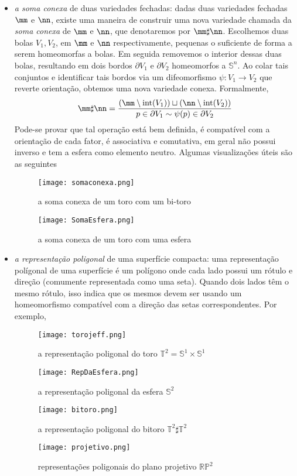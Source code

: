 \begin{itemize}
\item \emph{a soma conexa} de duas variedades fechadas: dadas duas variedades fechadas $\mm$ e $\nn$, existe uma maneira de construir uma nova variedade chamada da \emph{soma conexa} de $\mm$ e $\nn$, que denotaremos por $\mm \sharp \nn$. Escolhemos duas bolas $V_1, V_2$, em $\mm$ e $\nn$ respectivamente, pequenas o suficiente de forma a serem homeomorfas a bolas. Em seguida removemos o interior dessas duas bolas, resultando em dois bordos $\partial V_1$ e $\partial V_2$ homeomorfos a $\mathbb{S}^n$. Ao colar tais conjuntos e identificar tais bordos via um difeomorfismo $\psi: V_1 \to V_2$ que reverte orientação, obtemos uma nova variedade conexa. Formalmente, 
\[
\mm \sharp \nn = \frac{(\mm \setminus \text{int}(V_1)) \sqcup (\nn \setminus \text{int}(V_2))}{p \in \partial V_1 \sim \psi(p) \in \partial V_2}
\] Pode-se provar que tal operação está bem definida, é compatível com a orientação de cada fator, é associativa e comutativa, em geral não possui inverso e tem a esfera como elemento neutro. Algumas visualizações úteis são as seguintes
\begin{figure}[H]
\centering
\texttt{[image: somaconexa.png]}
\caption{a soma conexa de um toro com um bi-toro}
\end{figure}
\begin{figure}[H]
\centering
\texttt{[image: SomaEsfera.png]}
\caption{a soma conexa de um toro com uma esfera}
\end{figure}
\item \emph{a representação poligonal} de uma superfície compacta: uma representação polígonal de uma superfície é um polígono onde cada lado possui um rótulo e direção (comumente representada como uma seta). Quando dois lados têm o mesmo rótulo, isso indica que os mesmos devem ser  usando um homeomorfismo compatível com a direção das setas correspondentes. Por exemplo, 
\begin{figure}[H]
\centering
\texttt{[image: torojeff.png]}
\caption{a representação poligonal do toro $\mathbb{T}^2 = \mathbb{S}^1 \times \mathbb{S}^1$}
\end{figure}

\begin{figure}[H]
\centering
\texttt{[image: RepDaEsfera.png]}
\caption{a representação poligonal da esfera $\mathbb{S}^2$}
\end{figure}

\begin{figure}[H]
\centering
\texttt{[image: bitoro.png]}
\caption{a representação poligonal do bitoro $\mathbb{T}^2 \sharp \mathbb{T}^2$}
\end{figure}
\vspace{1cm}
\begin{figure}[H]
\centering
\texttt{[image: projetivo.png]}
\caption{representações poligonais do plano projetivo $\mathbb{R}\mathbb{P}^2$}
\end{figure}
\end{itemize}
